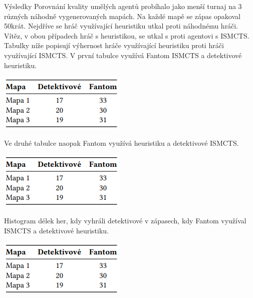 \documentclass[portrait,a0paper,fontscale=0.25]{baposter}
\begin{document}
\begin{poster}
\begin{posterbox}[column=1, name=result1]{Výsledky}
Porovnání kvality umělých agentů probíhalo jako menší turnaj na 3 různých náhodně vygenerovaných mapách. Na každé mapě se zápas opakoval 50krát. Nejdříve se hráč využívající heuristiku utkal proti náhodnému hráči. Vítěz, v obou případech hráč s heuristikou, se utkal s proti agentovi s ISMCTS. Tabulky níže popisují výhernost hráče využívající heuristiku proti hráči využívající ISMCTS.  
V první tabulce využívá Fantom ISMCTS a detektivové heuristiku.
\begin{center}
\includegraphics[width=0.7\linewidth]{img/fantom-mcts.png}
\end{center}

Ve druhé tabulce naopak Fantom využívá heuristiku a detektivové ISMCTS.
\begin{center}
\includegraphics[width=0.7\linewidth]{img/fantom-mcts.png}
\end{center}

Histogram délek her, kdy vyhráli detektivové v zápasech, kdy Fantom využíval ISMCTS a detektivové heuristiku.
\begin{center}
\includegraphics[width=0.7\linewidth]{img/fantom-mcts.png}
\end{center}





\end{posterbox}
\end{poster}
\end{document}
